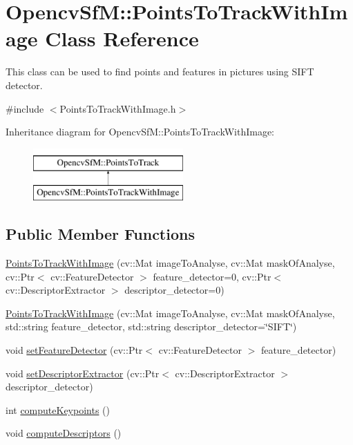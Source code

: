 \hypertarget{class_opencv_sf_m_1_1_points_to_track_with_image}{
\section{OpencvSfM::PointsToTrackWithImage Class Reference}
\label{class_opencv_sf_m_1_1_points_to_track_with_image}
}


This class can be used to find points and features in pictures using SIFT detector.  




{\ttfamily \#include $<$PointsToTrackWithImage.h$>$}

Inheritance diagram for OpencvSfM::PointsToTrackWithImage:\begin{figure}[H]
\begin{center}
\leavevmode
\includegraphics[height=2.000000cm]{class_opencv_sf_m_1_1_points_to_track_with_image}
\end{center}
\end{figure}
\subsection*{Public Member Functions}
\begin{DoxyCompactItemize}
\item 
\hyperlink{class_opencv_sf_m_1_1_points_to_track_with_image_a16b5fffabd61a2e728c1d677307d221e}{PointsToTrackWithImage} (cv::Mat imageToAnalyse, cv::Mat maskOfAnalyse, cv::Ptr$<$ cv::FeatureDetector $>$ feature\_\-detector=0, cv::Ptr$<$ cv::DescriptorExtractor $>$ descriptor\_\-detector=0)
\item 
\hyperlink{class_opencv_sf_m_1_1_points_to_track_with_image_a617869848cca4ee8f7933b203eaf8638}{PointsToTrackWithImage} (cv::Mat imageToAnalyse, cv::Mat maskOfAnalyse, std::string feature\_\-detector, std::string descriptor\_\-detector=\char`\"{}SIFT\char`\"{})
\item 
void \hyperlink{class_opencv_sf_m_1_1_points_to_track_with_image_a08e85521d6884eec1d113dd81354502f}{setFeatureDetector} (cv::Ptr$<$ cv::FeatureDetector $>$ feature\_\-detector)
\item 
void \hyperlink{class_opencv_sf_m_1_1_points_to_track_with_image_a3438e554c9ef0d807ccad6799209bb50}{setDescriptorExtractor} (cv::Ptr$<$ cv::DescriptorExtractor $>$ descriptor\_\-detector)
\item 
int \hyperlink{class_opencv_sf_m_1_1_points_to_track_with_image_a4fba046ec6498fcea5b38253d19b80f9}{computeKeypoints} ()
\item 
void \hyperlink{class_opencv_sf_m_1_1_points_to_track_with_image_aee97104c9c66601e5c51237717cb2522}{computeDescriptors} ()
\end{DoxyCompactItemize}
